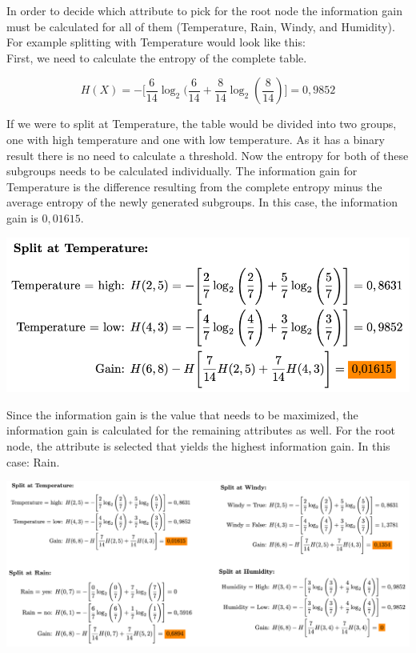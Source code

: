 \documentclass[
12pt,
headsepline,
bibliography=totoc,
twoside=semi,
fleqn
]{scrartcl}
\begin{document}
 
 In order to decide which attribute to pick for the root node the information gain must be calculated for all of them (Temperature, Rain, Windy, and Humidity). For example splitting with Temperature would look like this: \\

 First, we need to calculate the entropy of the complete table. 

\begin{equation}\label{fig:fig8}
   H(X)= - \biggl[\frac{6}{14}\log_2(\frac{6}{14}+\frac{8}{14}\log_2(\frac{8}{14})\biggr]=0,9852
\end{equation}  

 If we were to split at Temperature, the table would be divided into two groups, one with high temperature and one with low temperature. As it has a binary result there is no need to calculate a threshold. Now the entropy for both of these subgroups needs to be calculated individually. The information gain for Temperature is the difference resulting from the complete entropy minus the average entropy of the newly generated subgroups. In this case, the information gain is $0,01615$. 

 \begin{center}\includegraphics[scale=0.7]{BDT7.png}\label{fig:fig7}\end{center}

 Since the information gain is the value that needs to be maximized, the information gain is calculated for the remaining attributes as well. For the root node, the attribute is selected that yields the highest information gain. In this case: Rain. 

\includegraphics[scale=0.7]{BDT9.png}\label{fig:fig9}\\%
\end{document}
